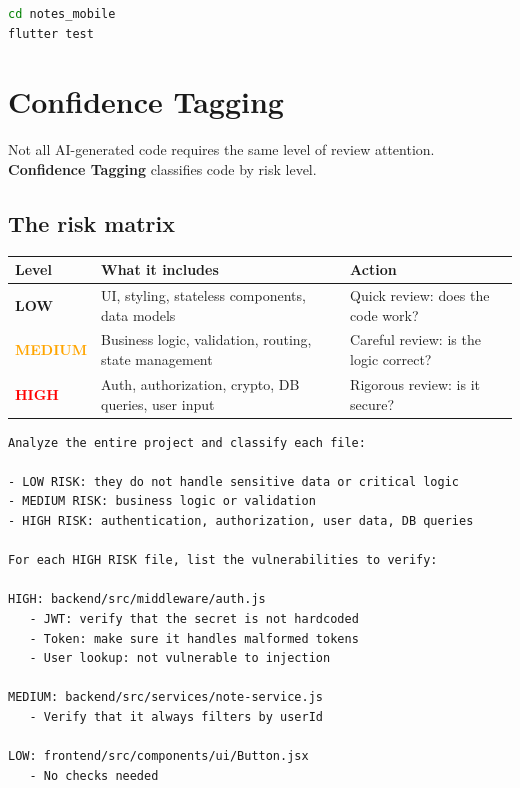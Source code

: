 \begin{lstlisting}[language=bash]
cd notes_mobile
flutter test
\end{lstlisting}

\section{Confidence Tagging}

Not all AI-generated code requires the same level of review attention. \textbf{Confidence Tagging} classifies code by risk level.

\subsection{The risk matrix}

\begin{center}
\begin{tabularx}{\textwidth}{l l X}
\toprule
\textbf{Level} & \textbf{What it includes} & \textbf{Action} \\
\midrule
\textcolor{green!60!black}{\textbf{LOW}} & UI, styling, stateless components, data models & Quick review: does the code work? \\
\textcolor{orange}{\textbf{MEDIUM}} & Business logic, validation, routing, state management & Careful review: is the logic correct? \\
\textcolor{red}{\textbf{HIGH}} & Auth, authorization, crypto, DB queries, user input & Rigorous review: is it secure? \\
\bottomrule
\end{tabularx}
\end{center}

\begin{praticabox}[title={Practice --- Project risk analysis}]
\begin{lstlisting}[language={}]
Analyze the entire project and classify each file:

- LOW RISK: they do not handle sensitive data or critical logic
- MEDIUM RISK: business logic or validation
- HIGH RISK: authentication, authorization, user data, DB queries

For each HIGH RISK file, list the vulnerabilities to verify:

HIGH: backend/src/middleware/auth.js
   - JWT: verify that the secret is not hardcoded
   - Token: make sure it handles malformed tokens
   - User lookup: not vulnerable to injection

MEDIUM: backend/src/services/note-service.js
   - Verify that it always filters by userId

LOW: frontend/src/components/ui/Button.jsx
   - No checks needed
\end{lstlisting}
\end{praticabox}

